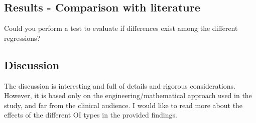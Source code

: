 \documentclass{AR2RC}
\begin{document}
\subsection{Results - Comparison with literature}
Could you perform a test to evaluate if differences exist among the different regressions?

\subsection{Discussion}
The discussion is interesting and full of details and rigorous considerations. However, it is based only on the engineering/mathematical approach used in the study, and far from the clinical audience. I would like to read more about the effects of the different OI types in the provided findings.
\end{document}
